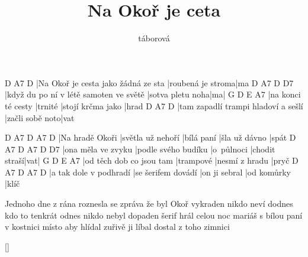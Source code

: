 \documentclass{song}
\title{Na Okoř je ceta}
\author{táborová}
\begin{document}
\strophe
D                                   A7                 D
|Na Okoř je cesta jako žádná ze sta |roubená je stroma|ma
D                                      A7               D  D7
|když du po ní v létě samoten ve světě |sotva pletu noha|ma|
G                  D       E                 A7
|na konci té cesty |trnité |stojí krčma jako |hrad
D                                   A7              D
|tam zapadlí trampi hladoví a sešlí |začli sobě noto|vat
\endstrophe

D               A7                D          A7            D
|Na hradě Okoři |světla už nehoří |bílá paní |šla už dávno |spát
D                  A7                  D          A7            D   D7
|ona měla ve zvyku |podle svého budíku |o~půlnoci |chodit straší|vat|
G                        D         E              A7
|od těch dob co jsou tam |trampové |nesmí z hradu |pryč
D                      A7                 D             A7          D
|a tak dole v podhradí |se šerifem dovádí |on ji sebral |od komůrky |klíč
\endstrophe

\strophe*
Jednoho dne z rána roznesla se zpráva že byl Okoř vykraden
nikdo neví dodnes kdo to tenkrát odnes nikdo nebyl dopaden
šerif hrál celou noc mariáš s bílou paní v kostnici
místo aby hlídal zuřivě ji líbal dostal z toho zimnici
\endstrophe

\ref{}
\end{document}
